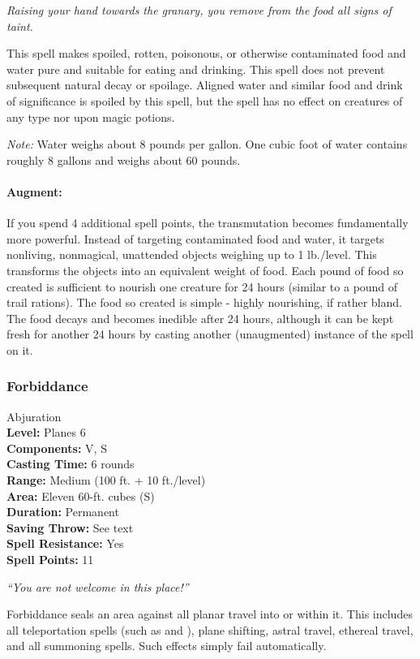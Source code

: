 \emph{Raising your hand towards the granary, you remove from the food all signs of taint.}

This spell makes spoiled, rotten, poisonous, or otherwise contaminated food and water pure and suitable for eating and drinking. 
This spell does not prevent subsequent natural decay or spoilage. 
Aligned water and similar food and drink of significance is spoiled by this spell, but the spell has no effect on creatures of any type nor upon magic potions.

\emph{Note:} Water weighs about 8 pounds per gallon. One cubic foot of water contains roughly 8 gallons and weighs about 60 pounds.

\paragraph{Augment:} If you spend 4 additional spell points, the transmutation becomes fundamentally more powerful. Instead of targeting contaminated food and water, it targets nonliving, nonmagical, unattended objects weighing up to 1 lb./level. This transforms the objects into an equivalent weight of food. Each pound of food so created is sufficient to nourish one creature for 24 hours (similar to a pound of trail rations). 
The food so created is simple - highly nourishing, if rather bland.
The food decays and becomes inedible after 24 hours, although it can be kept fresh for another 24 hours by casting another (unaugmented) instance of the spell on it.

\subsubsection{Forbiddance}
\label{Spell:Forbiddance}
Abjuration
\\ \textbf{Level:} Planes 6
\\ \textbf{Components:} V, S
\\ \textbf{Casting Time:} 6 rounds
\\ \textbf{Range:} Medium (100 ft. + 10 ft./level)
\\ \textbf{Area:} Eleven 60-ft. cubes (S)
\\ \textbf{Duration:} Permanent
\\ \textbf{Saving Throw:} See text
\\ \textbf{Spell Resistance:} Yes
\\ \textbf{Spell Points:} 11

\emph{``You are not welcome in this place!''}

Forbiddance seals an area against all planar travel into or within it. 
This includes all teleportation spells (such as  and ), plane shifting, astral travel, ethereal travel, and all summoning spells. 
Such effects simply fail automatically.

